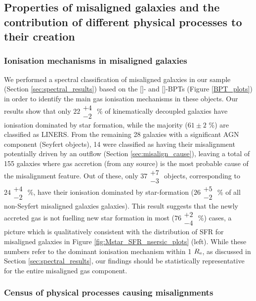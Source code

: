 \documentclass[fleqn,usenatbib]{mnras}
\begin{document}
\subsection {Properties of misaligned galaxies and the contribution of different physical processes to their creation}
\label{sec:discuss_spectral_phys_cause}
 
\subsubsection{Ionisation mechanisms in misaligned galaxies}

We performed a spectral classification of misaligned galaxies in our sample (Section \ref{sec:spectral_results})  based on the []- and []-BPTs (Figure \ref{BPT_plots}) in order to identify the main gas ionisation mechanisms in these objects. Our results show that only $22\substack{+4 \\ -2}$ \% of kinematically decoupled galaxies have ionisation dominated by star formation, while the majority ($61 \pm 2$ \%) are classified as LINERS. From the remaining 28 galaxies with a significant AGN component (Seyfert objects), 14 were classified as having their misalignment potentially driven by an outflow (Section \ref{sec:misalign_cause}), leaving a total of 155 galaxies where gas accretion (from any source) is the most probable cause of the misalignment feature. Out of these, only $37\substack{+7 \\ -3}$ objects, corresponding to $24\substack{+4 \\ -2}$ \%, have their ionisation dominated by star-formation ($26\substack{+5 \\ -2}$ \% of all non-Seyfert misaligned galaxies galaxies). This result suggests that the newly accreted gas is not fuelling new star formation in most ($76\substack{+2 \\ -4}$ \%) cases, a picture which is qualitatively consistent with the distribution of SFR for misaligned galaxies in Figure \ref{fig:Mstar_SFR_nsersic_plots} (left). While these numbers refer to the dominant ionisation mechanism within 1 $R_{\rm{e}}$, as discussed in Section \ref{sec:spectral_results}, our findings should be statistically representative for the entire misaligned gas component.

\subsubsection{Census of physical processes causing misalignments}
\end{document}
